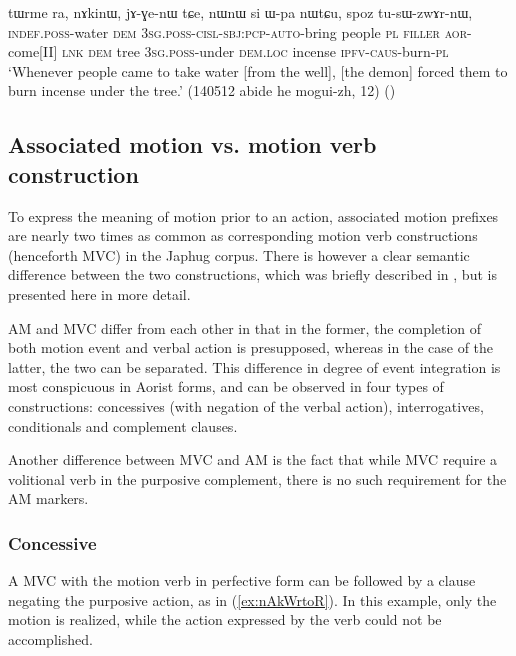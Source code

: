 \begin{exe}
\ex \label{ex:tWci.WGWkWnWru}
\gll [tɯ-ci nɯnɯ ɯ-ɣɯ-kɯ-nɯ-ru] tɯrme ra, nɤkinɯ, jɤ-ɣe-nɯ tɕe, nɯnɯ si ɯ-pa nɯtɕu, spoz tu-sɯ-zwɤr-nɯ, \\
\textsc{indef}.\textsc{poss}-water \textsc{dem} \textsc{3sg}.\textsc{poss}-\textsc{cisl}-\textsc{sbj}:\textsc{pcp}-\textsc{auto}-bring people \textsc{pl} \textsc{filler} \textsc{aor}-come[II] \textsc{lnk} \textsc{dem} tree \textsc{3sg}.\textsc{poss}-under \textsc{dem}.\textsc{loc} incense \textsc{ipfv}-\textsc{caus}-burn-\textsc{pl} \\
\glt `Whenever people came to take water [from the well], [the demon] forced them to burn incense under the tree.' (140512 abide he mogui-zh, 12)
()
\end{exe}

\subsection{Associated motion vs. motion verb construction} \label{sec:am.vs.mvc}
To express the meaning of motion prior to an action, associated motion prefixes are nearly two times as common as corresponding motion verb constructions (henceforth MVC) in the Japhug corpus. There is however a clear semantic difference between the two constructions, which was briefly described in \citet{jacques13harmonization}, but is presented here in more detail.

AM and MVC differ from each other in that in the former, the completion of both motion event and verbal action is presupposed, whereas in the case of the latter, the two can be separated. This difference in degree of event integration is most conspicuous in Aorist forms, and can be observed in four types of constructions: concessives (with negation of the verbal action), interrogatives, conditionals and complement clauses. 

Another difference between MVC and AM is the fact that while MVC require a volitional verb in the purposive complement, there is no such requirement for the AM markers.

\subsubsection{Concessive} \label{sec:am.concessive}
A MVC  with the motion verb in perfective form can be followed by a clause negating the purposive action, as in (\ref{ex:nAkWrtoR}). In this example, only the motion is realized, while the action expressed by the verb  could not be accomplished.

